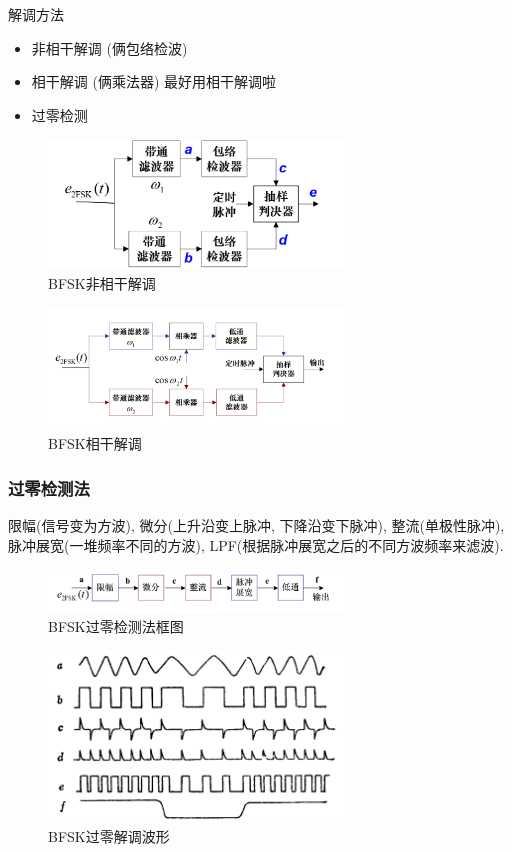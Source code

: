 \documentclass[a4paper]{report}
\begin{document}
解调方法
\begin{itemize}
  \item 非相干解调 (俩包络检波)
  \item 相干解调 (俩乘法器) 最好用相干解调啦
  \item 过零检测
\end{itemize}

\begin{figure}[H]
\centering
\includegraphics[width=0.7\textwidth]{bfsk_non_co.png}
\caption{BFSK非相干解调}
\end{figure}

\begin{figure}[H]
\centering
\includegraphics[width=0.7\textwidth]{bfsk_co.png}
\caption{BFSK相干解调}
\end{figure}


\subsubsection{过零检测法}
限幅(信号变为方波), 微分(上升沿变上脉冲, 下降沿变下脉冲), 整流(单极性脉冲), 脉冲展宽(一堆频率不同的方波), LPF(根据脉冲展宽之后的不同方波频率来滤波). 

\begin{figure}[H]
\centering
\includegraphics[width=0.7\textwidth]{bfsk_zero_crossing.png}
\caption{BFSK过零检测法框图}
\end{figure}
\begin{figure}[H]
\centering
\includegraphics[width=0.7\textwidth]{bfsk_zero_crossing_wave.png}
\caption{BFSK过零解调波形}
\end{figure}
\end{document}
